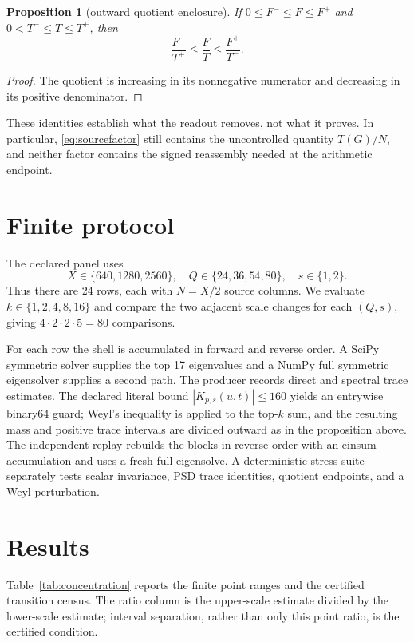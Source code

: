 \documentclass[10pt]{article}
\newtheorem{proposition}{Proposition}
\begin{document}
\begin{proposition}[outward quotient enclosure]
If $0\leq F^-\leq F\leq F^+$ and
$0<T^-\leq T\leq T^+$, then
\[
 \frac{F^-}{T^+}\leq\frac{F}{T}\leq\frac{F^+}{T^-}.
\]
\end{proposition}
\begin{proof}
The quotient is increasing in its nonnegative numerator and decreasing in
its positive denominator.
\end{proof}

These identities establish what the readout removes, not what it proves.
In particular, \eqref{eq:sourcefactor} still contains the uncontrolled
quantity $T(G)/N$, and neither factor contains the signed reassembly needed
at the arithmetic endpoint.

\section{Finite protocol}

The declared panel uses
\[
 X\in\{640,1280,2560\},\quad Q\in\{24,36,54,80\},\quad s\in\{1,2\}.
\]
Thus there are 24 rows, each with $N=X/2$ source columns.  We evaluate
$k\in\{1,2,4,8,16\}$ and compare the two adjacent scale changes for each
$(Q,s)$, giving $4\cdot2\cdot2\cdot5=80$ comparisons.

For each row the shell is accumulated in forward and reverse order.  A
SciPy symmetric solver supplies the top 17 eigenvalues and a NumPy full
symmetric eigensolver supplies a second path.  The producer records direct
and spectral trace estimates.  The declared literal bound
$|K_{p,s}(u,t)|\leq160$ yields an entrywise binary64 guard; Weyl's inequality
is applied to the top-$k$ sum, and the resulting mass and positive trace
intervals are divided outward as in the proposition above.  The independent
replay rebuilds the blocks in reverse order with an einsum accumulation and
uses a fresh full eigensolve.  A deterministic stress suite separately tests
scalar invariance, PSD trace identities, quotient endpoints, and a Weyl
perturbation.

\section{Results}

Table~\ref{tab:concentration} reports the finite point ranges and the
certified transition census.  The ratio column is the upper-scale estimate
divided by the lower-scale estimate; interval separation, rather than only
this point ratio, is the certified condition.
\end{document}
